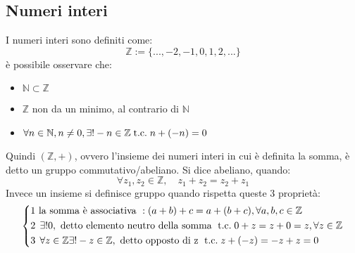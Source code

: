 \documentclass[a4paper,12pt]{article}
\begin{document}
	\subsection{Numeri interi}
	I numeri interi sono definiti come:
	\[\mathbb{Z} := \{..., -2, -1, 0, 1, 2, ...\}\]
	è possibile osservare che:
	\begin{itemize}
		\item $\mathbb{N} \subset \mathbb{Z}$
		\item $\mathbb{Z}$ non da un minimo, al contrario di $\mathbb{N}$
		\item $\forall n \in \mathbb{N}, n \not = 0, \exists! -n \in \mathbb{Z} \;\text{t.c.}\; n + (-n) = 0$
	\end{itemize}
	Quindi $(\mathbb{Z}, +)$, ovvero l'insieme dei numeri interi in cui è definita la somma, è detto un gruppo commutativo/abeliano.
	Si dice abeliano, quando:
	\[\forall z_1,z_2 \in \mathbb{Z}, \quad z_1 + z_2 = z_2 + z_1\]
	Invece un insieme si definisce gruppo quando rispetta queste 3 proprietà:
	\[
	\left\{\begin{aligned}
		1 & \text{ la somma è associativa }: (a+b) + c = a + (b + c), \forall a,b,c \in \mathbb{Z}\\
		2 & \; \, \exists! 0, \text{ detto elemento neutro della somma } \;\text{t.c.}\; 0 + z = z + 0 = z, \forall z \in \mathbb{Z}\\
		3 & \; \, \forall z \in \mathbb{Z} \exists! -z \in \mathbb{Z}, \text{ detto opposto di z } \;\text{t.c.}\; z + (-z) = - z + z = 0
	\end{aligned}\right.\]	
\end{document}
